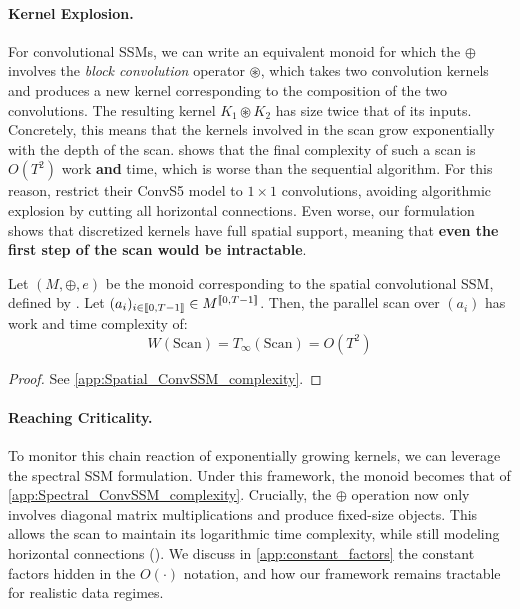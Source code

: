 \documentclass{article}
\begin{document}
\paragraph{Kernel Explosion.} For convolutional SSMs, we can write an equivalent monoid for which the $\oplus$ involves the \emph{block convolution} operator $\circledast$, which takes two convolution kernels and produces a new kernel corresponding to the composition of the two convolutions. The resulting kernel $K_1 \circledast K_2$ has size twice that of its inputs. Concretely, this means that the kernels involved in the scan grow exponentially with the depth of the scan.  shows that the final complexity of such a scan is $O(T^2)$ work \textbf{and} time, which is worse than the sequential algorithm.
%
For this reason, \citet{smith2023convs5} restrict their ConvS5 model to $1 \!\times\! 1$ convolutions, avoiding algorithmic explosion by cutting all horizontal connections. Even worse, our formulation shows that discretized kernels have full spatial support, meaning that \textbf{even the first step of the scan would be intractable}.

\begin{proposition}
\label{prop:Spatial_ConvSSM_complexity}
    Let $(M, \oplus, e)$ be the monoid corresponding to the spatial convolutional SSM, defined by . Let $(a_i)_{i\in \llbracket 0, T-1 \rrbracket}\in M^{\llbracket 0, T-1 \rrbracket}$. Then, the parallel scan over $(a_i)$ has work and time complexity of:
\[
    W(\mathrm{Scan}) = T_\infty(\mathrm{Scan}) = O(T^2)
\]
\end{proposition}

\begin{proof}
See \cref{app:Spatial_ConvSSM_complexity}.
\end{proof}

\paragraph{Reaching Criticality.} To monitor this chain reaction of exponentially growing kernels, we can leverage the spectral SSM formulation. Under this framework, the monoid becomes that of \cref{app:Spectral_ConvSSM_complexity}. Crucially, the $\oplus$ operation now only involves diagonal matrix multiplications and produce fixed-size objects. This allows the scan to maintain its logarithmic time complexity, while still modeling horizontal connections (). We discuss in \cref{app:constant_factors} the constant factors hidden in the $O(\cdot)$ notation, and how our framework remains tractable for realistic data regimes.
\end{document}
